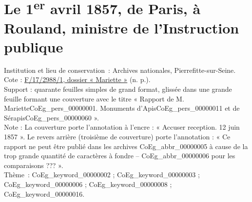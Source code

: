 \documentclass{book}
\begin{document}
\hypertarget{CoEg_Mariette_1857-04-01}{}

\section*{Le 1\textsuperscript{er} avril 1857, de Paris, à Rouland, ministre de l’Instruction publique}
 \label{labCoEg_Mariette_1857-04-01}
{\footnotesize
\noindent Institution et lieu de conservation~: Archives nationales, Pierrefitte-sur-Seine.\\
Cote : \hyperlink{CoEg_Mariette_ms_002}{F/17/2988/1, dossier « Mariette »} (n. p.).\\
Support : quarante feuilles simples de grand format, glissée dans une grande feuille formant une couverture avec le titre « Rapport de M. Mariette\gls{CoEg_pers_00000001}. Monuments d’Apis\gls{CoEg_pers_00000011} et de Sérapis\gls{CoEg_pers_00000060} ».\\
Note : La couverture porte l’annotation à l’encre : « Accuser reception. 12 juin 1857 ». Le revers arrière (troisième de couverture) porte l’annotation : « Ce rapport ne peut être publié dans les archives \gls{CoEg_abbr_00000005} à cause de la trop grande quantité de caractères à fondre – \gls{CoEg_abbr_00000006} pour les comparaisons ??? ».\\
Thème~: \gls{CoEg_keyword_00000002} ; \gls{CoEg_keyword_00000003} ; \gls{CoEg_keyword_00000006} ; \gls{CoEg_keyword_00000008} ; \gls{CoEg_keyword_00000016}.}
\end{document}
